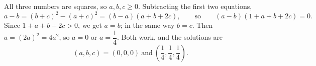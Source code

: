 All three numbers are squares, so $a,b,c\ge0$. Subtracting the first two equations,
\[
a-b=(b+c)^2-(a+c)^2=(b-a)(a+b+2c),\qquad\text{so}\qquad (a-b)(1+a+b+2c)=0 .
\]
Since $1+a+b+2c>0$, we get $a=b$; in the same way $b=c$. Then $a=(2a)^2=4a^2$, so $a=0$ or $a=\dfrac{1}{4}$. Both work, and the solutions are
\[
\boxed{(a,b,c)=(0,0,0)\ \text{and}\ \left(\dfrac{1}{4},\dfrac{1}{4},\dfrac{1}{4}\right)}.
\]
